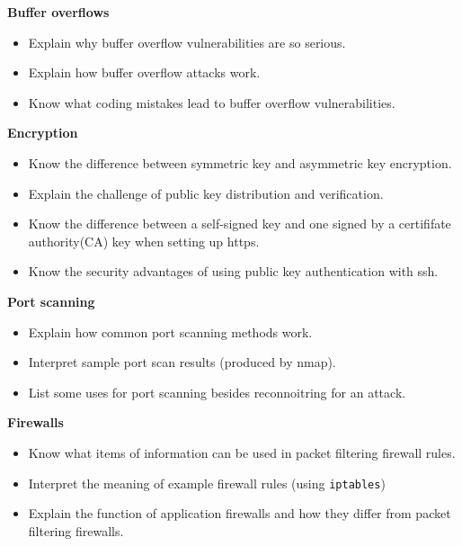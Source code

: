 \documentclass{article}
\begin{document}
\textbf{Buffer overflows}

\begin{itemize}
	\item Explain why buffer overflow vulnerabilities are so serious.
	\item Explain how buffer overflow attacks work.
	\item Know what coding mistakes lead to buffer overflow vulnerabilities.
\end{itemize}

\textbf{Encryption}

\begin{itemize}
	\item Know the difference between symmetric key and asymmetric key encryption.
	\item Explain the challenge of public key distribution and verification.
	\item Know the difference between a self-signed key and one signed by a certififate authority(CA) key when setting up https. 
	\item Know the security advantages of using public key authentication with ssh.
\end{itemize}

\newpage

\textbf{Port scanning}

\begin{itemize}
	\item Explain how common port scanning methods work.
	\item Interpret sample port scan results (produced by nmap).
	\item List some uses for port scanning besides reconnoitring for an attack. 
\end{itemize}

\textbf{Firewalls}

\begin{itemize}
	\item Know what items of information can be used in packet filtering firewall rules.
	\item Interpret the meaning of example firewall rules (using \texttt{iptables})
	\item Explain the function of application firewalls and how they differ from packet filtering firewalls.
\end{itemize}
\end{document}
